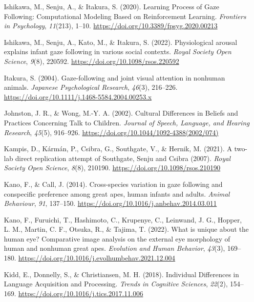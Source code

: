 \documentclass[
]{scrbook}
\newlength{\cslhangindent}
\newenvironment{CSLReferences}[2] %
 {\begin{list}{}{%
  \setlength{\itemindent}{0pt}
  \setlength{\leftmargin}{0pt}
  \setlength{\parsep}{0pt}
  \ifodd #1
   \setlength{\leftmargin}{\cslhangindent}
   \setlength{\itemindent}{-1\cslhangindent}
  \fi
  \setlength{\itemsep}{#2\baselineskip}}}
 {\end{list}}
\begin{document}
\begin{CSLReferences}{1}{0}
Ishikawa, M., Senju, A., \& Itakura, S. (2020). Learning {Process} of {Gaze Following}: {Computational Modeling Based} on {Reinforcement Learning}. \emph{Frontiers in Psychology}, \emph{11}(213), 1--10. \url{https://doi.org/10.3389/fpsyg.2020.00213}

Ishikawa, M., Senju, A., Kato, M., \& Itakura, S. (2022). Physiological arousal explains infant gaze following in various social contexts. \emph{Royal Society Open Science}, \emph{9}(8), 220592. \url{https://doi.org/10.1098/rsos.220592}

Itakura, S. (2004). Gaze-following and joint visual attention in nonhuman animals. \emph{Japanese Psychological Research}, \emph{46}(3), 216--226. \url{https://doi.org/10.1111/j.1468-5584.2004.00253.x}

Johnston, J. R., \& Wong, M.-Y. A. (2002). Cultural {Differences} in {Beliefs} and {Practices Concerning Talk} to {Children}. \emph{Journal of Speech, Language, and Hearing Research}, \emph{45}(5), 916--926. \url{https://doi.org/10.1044/1092-4388(2002/074)}

Kampis, D., Kármán, P., Csibra, G., Southgate, V., \& Hernik, M. (2021). A two-lab direct replication attempt of {Southgate}, {Senju} and {Csibra} (2007). \emph{Royal Society Open Science}, \emph{8}(8), 210190. \url{https://doi.org/10.1098/rsos.210190}

Kano, F., \& Call, J. (2014). Cross-species variation in gaze following and conspecific preference among great apes, human infants and adults. \emph{Animal Behaviour}, \emph{91}, 137--150. \url{https://doi.org/10.1016/j.anbehav.2014.03.011}

Kano, F., Furuichi, T., Hashimoto, C., Krupenye, C., Leinwand, J. G., Hopper, L. M., Martin, C. F., Otsuka, R., \& Tajima, T. (2022). What is unique about the human eye? {Comparative} image analysis on the external eye morphology of human and nonhuman great apes. \emph{Evolution and Human Behavior}, \emph{43}(3), 169--180. \url{https://doi.org/10.1016/j.evolhumbehav.2021.12.004}

Kidd, E., Donnelly, S., \& Christiansen, M. H. (2018). Individual {Differences} in {Language Acquisition} and {Processing}. \emph{Trends in Cognitive Sciences}, \emph{22}(2), 154--169. \url{https://doi.org/10.1016/j.tics.2017.11.006}


\end{CSLReferences}
\end{document}
